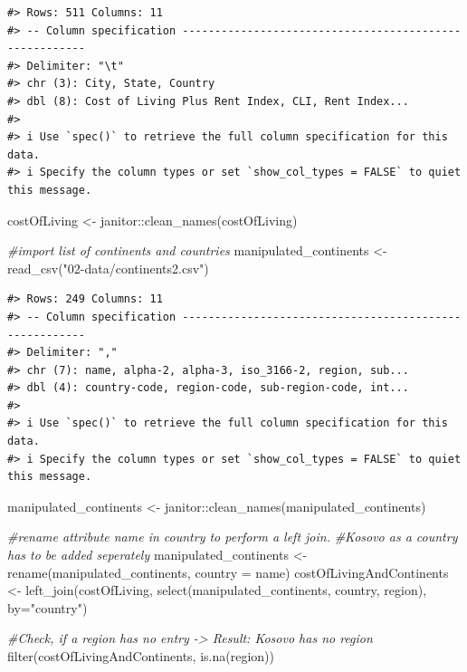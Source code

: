 \documentclass[
  11pt,
  a4paper,
  twoside]{scrbook}
\newenvironment{Shaded}{\begin{snugshade}}{\end{snugshade}}
\newcommand{\AttributeTok}[1]{\textcolor[rgb]{0.77,0.63,0.00}{#1}}
\newcommand{\CommentTok}[1]{\textcolor[rgb]{0.56,0.35,0.01}{\textit{#1}}}
\newcommand{\FunctionTok}[1]{\textcolor[rgb]{0.00,0.00,0.00}{#1}}
\newcommand{\NormalTok}[1]{#1}
\newcommand{\OtherTok}[1]{\textcolor[rgb]{0.56,0.35,0.01}{#1}}
\newcommand{\SpecialCharTok}[1]{\textcolor[rgb]{0.00,0.00,0.00}{#1}}
\newcommand{\StringTok}[1]{\textcolor[rgb]{0.31,0.60,0.02}{#1}}
\begin{document}
\linespread{1}

\begin{verbatim}
#> Rows: 511 Columns: 11
#> -- Column specification -------------------------------------------------------
#> Delimiter: "\t"
#> chr (3): City, State, Country
#> dbl (8): Cost of Living Plus Rent Index, CLI, Rent Index...
#> 
#> i Use `spec()` to retrieve the full column specification for this data.
#> i Specify the column types or set `show_col_types = FALSE` to quiet this message.
\end{verbatim}

\linespread{1}

\begin{Shaded}
\begin{Highlighting}[]
\NormalTok{costOfLiving }\OtherTok{\textless{}{-}}\NormalTok{ janitor}\SpecialCharTok{::}\FunctionTok{clean\_names}\NormalTok{(costOfLiving)}

\CommentTok{\#import list of continents and countries}
\NormalTok{manipulated\_continents }\OtherTok{\textless{}{-}} \FunctionTok{read\_csv}\NormalTok{(}\StringTok{"02{-}data/continents2.csv"}\NormalTok{)}
\end{Highlighting}
\end{Shaded}

\linespread{1}

\begin{verbatim}
#> Rows: 249 Columns: 11
#> -- Column specification -------------------------------------------------------
#> Delimiter: ","
#> chr (7): name, alpha-2, alpha-3, iso_3166-2, region, sub...
#> dbl (4): country-code, region-code, sub-region-code, int...
#> 
#> i Use `spec()` to retrieve the full column specification for this data.
#> i Specify the column types or set `show_col_types = FALSE` to quiet this message.
\end{verbatim}

\linespread{1}

\begin{Shaded}
\begin{Highlighting}[]
\NormalTok{manipulated\_continents }\OtherTok{\textless{}{-}}\NormalTok{ janitor}\SpecialCharTok{::}\FunctionTok{clean\_names}\NormalTok{(manipulated\_continents)}

\CommentTok{\#rename attribute \textquotesingle{}name\textquotesingle{} in \textquotesingle{}country\textquotesingle{} to perform a left join.}
\CommentTok{\#Kosovo as a country has to be added seperately}
\NormalTok{manipulated\_continents }\OtherTok{\textless{}{-}} \FunctionTok{rename}\NormalTok{(manipulated\_continents, }\AttributeTok{country =}\NormalTok{ name)}
\NormalTok{costOfLivingAndContinents }\OtherTok{\textless{}{-}} \FunctionTok{left\_join}\NormalTok{(costOfLiving, }\FunctionTok{select}\NormalTok{(manipulated\_continents, country, region), }\AttributeTok{by=}\StringTok{"country"}\NormalTok{)}

\CommentTok{\#Check, if a region has no entry {-}\textgreater{} Result: Kosovo has no region}
\FunctionTok{filter}\NormalTok{(costOfLivingAndContinents, }\FunctionTok{is.na}\NormalTok{(region))}
\end{Highlighting}
\end{Shaded}
\end{document}
